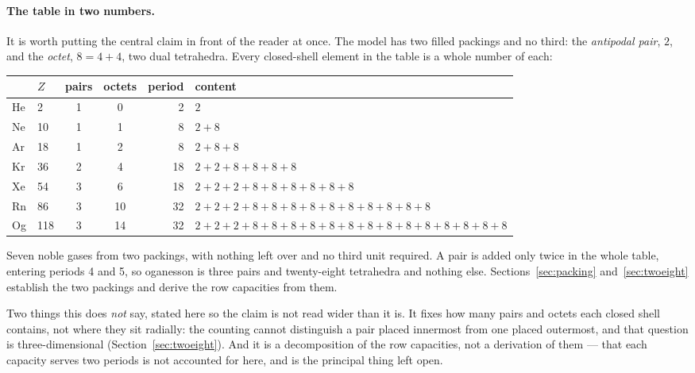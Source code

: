 \documentclass[11pt]{article}
\begin{document}
\paragraph{The table in two numbers.} It is worth putting the central claim in front of the
reader at once. The model has two filled packings and no third: the \emph{antipodal pair}, $2$,
and the \emph{octet}, $8=4{+}4$, two dual tetrahedra. Every closed-shell element in the table is
a whole number of each:
\begin{center}\footnotesize
\begin{tabular}{llccrl}
\hline
 & $Z$ & pairs & octets & period & content \\
\hline
He & 2 & 1 &  0 & 2 & $2$ \\
Ne & 10 & 1 &  1 & 8 & $2{+}8$ \\
Ar & 18 & 1 &  2 & 8 & $2{+}8{+}8$ \\
Kr & 36 & 2 &  4 & 18 & $2{+}2{+}8{+}8{+}8{+}8$ \\
Xe & 54 & 3 &  6 & 18 & $2{+}2{+}2{+}8{+}8{+}8{+}8{+}8{+}8$ \\
Rn & 86 & 3 & 10 & 32 & $2{+}2{+}2{+}8{+}8{+}8{+}8{+}8{+}8{+}8{+}8{+}8{+}8$ \\
Og & 118 & 3 & 14 & 32 & $2{+}2{+}2{+}8{+}8{+}8{+}8{+}8{+}8{+}8{+}8{+}8{+}8{+}8{+}8{+}8{+}8$ \\
\hline
\end{tabular}
\end{center}
\noindent Seven noble gases from two packings, with nothing left over and no third unit
required. A pair is added only twice in the whole table, entering periods 4 and 5, so oganesson
is three pairs and twenty-eight tetrahedra and nothing else.
Sections~\ref{sec:packing} and~\ref{sec:twoeight} establish the two packings and derive the row
capacities from them.

Two things this does \emph{not} say, stated here so the claim is not read wider than it is.
It fixes how many pairs and octets each closed shell contains, not where they sit radially: the
counting cannot distinguish a pair placed innermost from one placed outermost, and that question
is three-dimensional (Section~\ref{sec:twoeight}). And it is a decomposition of the row
capacities, not a derivation of them --- that each capacity serves two periods is not accounted
for here, and is the principal thing left open.
\end{document}
